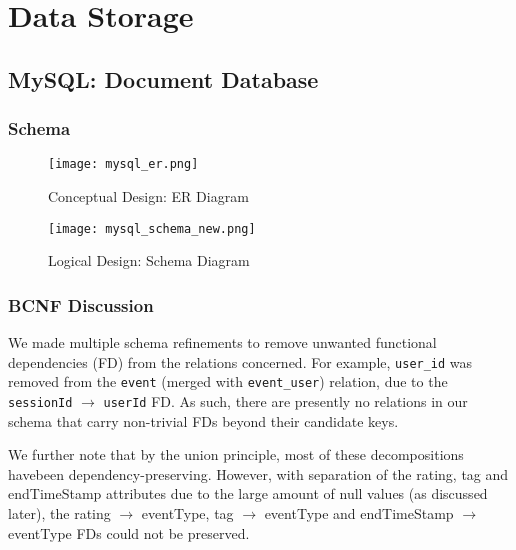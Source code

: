 \documentclass[10pt,titlepage]{article}
\begin{document}
\section{Data Storage}

\subsection{MySQL: Document Database}
\subsubsection{Schema}
\begin{figure}[H]
    \hspace*{-2cm}\texttt{[image: mysql\_er.png]}
    \caption{Conceptual Design: ER Diagram}
    \label{fig:mysql_er}
\end{figure}

\begin{center}
    \begin{figure}[H]
        \centering
        \hspace*{-2cm}\texttt{[image: mysql\_schema\_new.png]}
        \caption{Logical Design: Schema Diagram}
        \label{fig:mysql_schema}
    \end{figure}
\end{center}

\subsubsection{BCNF Discussion}

We made multiple schema refinements to remove unwanted functional dependencies (FD) from the relations concerned. For
example, \texttt{user\_id} was removed from the \texttt{event} (merged with
\texttt{event\_user}) relation, due to the \texttt{sessionId} $\rightarrow$ \texttt{userId} FD. As such, there are
presently no relations in our schema that carry non-trivial FDs beyond their candidate keys.

We further note that by the union principle, most of these decompositions havebeen dependency-preserving. However, with separation of the rating, tag and endTimeStamp attributes due to the large amount of null values (as discussed later), the rating $\rightarrow$ eventType, tag $\rightarrow$ eventType and endTimeStamp $\rightarrow$ eventType FDs could not be preserved.
\end{document}
